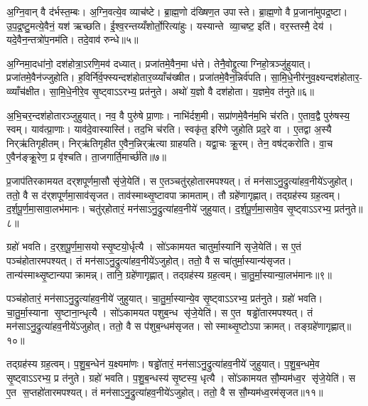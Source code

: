 अ॒ग्नि॒वान् वै द॑र्भस्त॒म्बः। अ॒ग्नि॒वत्ये॒व व्याच॑ष्टे। ब्रा॒ह्म॒णो द॑ख्षिण॒त उपास्ते। ब्रा॒ह्म॒णो वै प्र॒जाना॑मुपद्र॒ष्टा। उ॒प॒द्र॒ष्टु॒मत्ये॒वैनं॒ यश॑ ऋच्छति। ई॒श्व॒रन्तय्यँशोर्तो॒रित्या॑हुः। यस्यान्ते व्या॒चष्ट॒ इति॑। वर॒स्तस्मै॒ देय॑। यदे॒वैन॒न्तत्रो॑प॒नम॑ति। तदे॒वाव॑ रुन्धे॥५॥

अ॒ग्निमा॒दधा॑नो॒ दश॑होत्रा॒ऽरणि॒मव॑ दध्यात्। प्रजा॑तमे॒वैन॒मा ध॑त्ते। तेनै॒वोद्द्रुत्याग्निहो॒त्रञ्जु॑हुयात्। प्रजा॑तमे॒वैन॑ज्जुहोति। ह॒विर्नि॑र्व॒फ्स्यन्दश॑होतार॒व्य्याँच॑ख्षीत। प्रजा॑तमे॒वैन॒न्निर्व॑पति। सा॒मि॒धे॒नीर॑नुव॒क्ष्यन्दश॑होतार॒- व्व्याँच॑क्षीत। सा॒मि॒धे॒नीरे॒व सृ॒ष्ट्वाऽऽरभ्य॒ प्रत॑नुते। अथो॑ य॒ज्ञो वै दश॑होता। य॒ज्ञमे॒व त॑नुते॥६॥

अ॒भि॒चर॒न्दश॑होतारञ्जुहुयात्। नव॒ वै पुरु॑षे प्रा॒णाः। नाभि॑र्दश॒मी। सप्रा॑णमे॒वैन॑म॒भि च॑रति। ए॒ताव॒द्वै पुरु॑षस्य॒ स्वम्। याव॑त्प्रा॒णाः। याव॑दे॒वास्यास्ति॑। तद॒भि च॑रति। स्वकृ॑त॒ इरि॑णे जुहोति प्रद॒रे वा। ए॒तद्वा अ॒स्यै निर्‌ऋ॑तिगृहीतम्। निर्‌ऋ॑तिगृहीत ए॒वैन॒न्निर्‌ऋ॑त्या ग्राहयति। यद्वा॒चः क्रू॒रम्। तेन॒ वष॑ट्करोति। वा॒च ए॒वैन॑ङ्क्रू॒रेण॒ प्र वृ॑श्चति। ता॒जगार्ति॒मार्च्छ॑ति॥७॥\anuvakamend[दश॑होता॒ सृष्ट्या॑ ऋ॒च्छेद्व्याच॑प्टे रुन्ध ए॒व त॑नुते॒ निर्‌ऋ॑तिगृहीतं॒ पञ्च॑ च]

प्र॒जाप॑तिरकामयत दर्‌शपूर्णमा॒सौ सृ॑जे॒येति॑। स ए॒तञ्चतु॑र्‌होतारमपश्यत्। तं मन॑साऽनु॒द्रुत्या॑हव॒नीये॑ऽजुहोत्। ततो॒ वै स द॑र्‌शपूर्णमा॒साव॑सृजत। ताव॑स्माथ्सृ॒ष्टावपाक्रामताम्। तौ ग्रहे॑णागृह्णात्। तद्ग्रह॑स्य ग्रह॒त्वम्। द॒र्श॒पू॒र्ण॒मा॒सावा॒लभ॑मानः। चतु॑र्‌होतारं॒ मन॑साऽनु॒द्रुत्या॑हव॒नीये॑ जुहुयात्। द॒र्श॒पू॒र्ण॒मा॒सावे॒व सृ॒ष्ट्वाऽऽरभ्य॒ प्रत॑नुते॥८॥

ग्रहो॑ भवति। द॒र्‌श॒पू॒र्ण॒मा॒सयोस्सृ॒ष्टयो॒र्धृत्यै। सो॑ऽकामयत चातुर्मा॒स्यानि॑ सृजे॒येति॑। स ए॒तं पञ्च॑होतारमपश्यत्। तं मन॑साऽनु॒द्रुत्या॑हव॒नीये॑ऽजुहोत्। ततो॒ वै स चा॑तुर्मा॒स्यान्य॑सृजत। तान्य॑स्माथ्सृ॒ष्टान्यपाक्रामन्न्। तानि॒ ग्रहे॑णागृह्णात्। तद्ग्रह॑स्य ग्रह॒त्वम्। चा॒तु॒र्मा॒स्यान्या॒लभ॑मानः॥९॥

पञ्च॑होतारं॒ मन॑साऽनु॒द्रुत्या॑हव॒नीये॑ जुहुयात्। चा॒तु॒र्मा॒स्यान्ये॒व सृ॒ष्ट्वाऽऽरभ्य॒ प्रत॑नुते। ग्रहो॑ भवति। चा॒तु॒र्मा॒स्याना सृ॒ष्टाना॒न्धृत्यै। सो॑ऽकामयत पशुब॒न्ध सृ॑जे॒येति॑। स ए॒त षड्ढो॑तारमपश्यत्। तं मन॑साऽनु॒द्रुत्या॑हव॒नीये॑ऽजुहोत्। ततो॒ वै स प॑शुब॒न्धम॑सृजत। सोस्माथ्सृ॒ष्टोऽपाक्रामत्। तङ्ग्रहे॑णागृह्णात्॥१०॥

तद्ग्रह॑स्य ग्रह॒त्वम्। प॒शु॒ब॒न्धेन॑ य॒क्ष्यमा॑णः। षड्ढो॑तारं॒ मन॑साऽनु॒द्रुत्या॑हव॒नीये॑ जुहुयात्। प॒शु॒ब॒न्धमे॒व सृ॒ष्ट्वाऽऽरभ्य॒ प्र त॑नुते। ग्रहो॑ भवति। प॒शु॒ब॒न्धस्य॑ सृ॒ष्टस्य॒ धृत्यै। सो॑ऽकामयत सौ॒म्यम॑ध्व॒र सृ॑जे॒येति॑। स ए॒त स॒प्तहो॑तारमपश्यत्। तं मन॑साऽनु॒द्रुत्या॑हव॒नीये॑ऽजुहोत्। ततो॒ वै स सौ॒म्यम॑ध्व॒रम॑सृजत॥११॥

